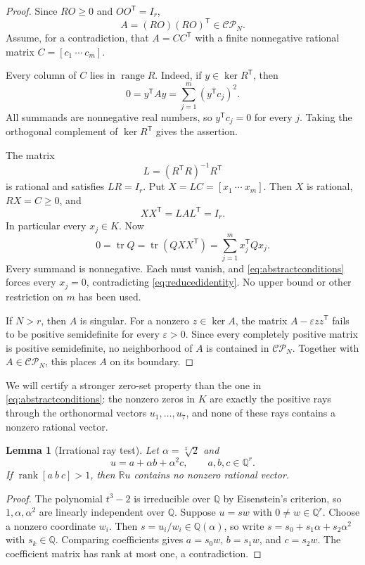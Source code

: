 \documentclass[11pt]{article}
\newtheorem{lemma}[theorem]{Lemma}
\theoremstyle{definition}
\newcommand{\R}{\mathbb R}
\newcommand{\Q}{\mathbb Q}
\newcommand{\CP}{\mathcal{CP}}
\newcommand{\rank}{\operatorname{rank}}
\newcommand{\tr}{\operatorname{tr}}
\newcommand{\range}{\operatorname{range}}
\newcommand{\trans}{^{\mathsf T}}
\numberwithin{equation}{section}
\begin{document}
\begin{proof}
Since $RO\geq0$ and $OO\trans=I_r$,
\begin{equation}\label{eq:realCP}
 A=(RO)(RO)\trans\in\CP_N.
\end{equation}
Assume, for a contradiction, that $A=CC\trans$ with a finite nonnegative
rational matrix $C=[c_1\ \cdots\ c_m]$.

Every column of $C$ lies in $\range R$. Indeed, if $y\in\ker R\trans$, then
\[
 0=y\trans Ay=\sum_{j=1}^m(y\trans c_j)^2.
\]
All summands are nonnegative real numbers, so $y\trans c_j=0$ for every $j$.
Taking the orthogonal complement of $\ker R\trans$ gives the assertion.

The matrix
\[
 L=(R\trans R)^{-1}R\trans
\]
is rational and satisfies $LR=I_r$. Put $X=LC=[x_1\ \cdots\ x_m]$.
Then $X$ is rational, $RX=C\geq0$, and
\begin{equation}\label{eq:reducedidentity}
 XX\trans=LAL\trans=I_r.
\end{equation}
In particular every $x_j\in K$. Now
\begin{equation}\label{eq:tracecontradiction}
 0=\tr Q=\tr(QXX\trans)=\sum_{j=1}^m x_j\trans Qx_j.
\end{equation}
Every summand is nonnegative. Each must vanish, and
\eqref{eq:abstractconditions} forces every $x_j=0$, contradicting
\eqref{eq:reducedidentity}. No upper bound or other restriction on $m$ has
been used.

If $N>r$, then $A$ is singular. For a nonzero $z\in\ker A$, the matrix
$A-\varepsilon zz\trans$ fails to be positive semidefinite for every
$\varepsilon>0$. Since every completely positive matrix is positive
semidefinite, no neighborhood of $A$ is contained in $\CP_N$. Together
with $A\in\CP_N$, this places $A$ on its boundary.
\end{proof}

We will certify a stronger zero-set property than the one in
\eqref{eq:abstractconditions}: the nonzero zeros in $K$ are exactly the
positive rays through the orthonormal vectors $u_1,\ldots,u_7$, and none of
these rays contains a nonzero rational vector.

\begin{lemma}[Irrational ray test]\label{lem:irrational}
Let $\alpha=\sqrt[3]{2}$ and
\[
 u=a+\alpha b+\alpha^2c,\qquad a,b,c\in\Q^r.
\]
If $\rank[a\ b\ c]>1$, then $\R u$ contains no nonzero rational vector.
\end{lemma}
\begin{proof}
The polynomial $t^3-2$ is irreducible over $\Q$ by Eisenstein's criterion,
so $1,\alpha,\alpha^2$ are linearly independent over $\Q$. Suppose
$u=sw$ with $0\ne w\in\Q^r$. Choose a nonzero coordinate $w_i$.
Then $s=u_i/w_i\in\Q(\alpha)$, so write
$s=s_0+s_1\alpha+s_2\alpha^2$ with $s_k\in\Q$.
Comparing coefficients gives $a=s_0w$, $b=s_1w$, and $c=s_2w$.
The coefficient matrix has rank at most one, a contradiction.
\end{proof}
\end{document}
